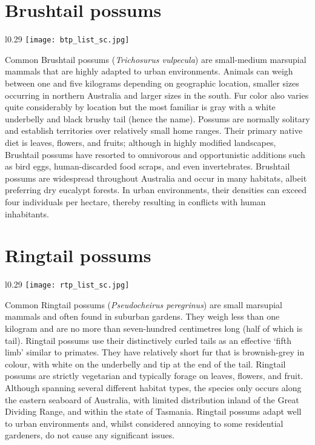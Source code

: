 \section{Brushtail possums}\label{btp}
\vspace{-0.3cm}
\setlength\intextsep{0pt}
\begin{wrapfigure}{l}{0.29\textwidth}
\centering
\texttt{[image: btp\_list\_sc.jpg]}
\end{wrapfigure}
Common Brushtail possums (\textit{Trichosurus vulpecula}) are small-medium marsupial mammals that are highly adapted to urban environments. Animals can weigh between one and five kilograms depending on geographic location, smaller sizes occurring in northern Australia and larger sizes in the south. Fur color also varies quite considerably by location but the most familiar is gray with a white underbelly and black brushy tail (hence the name). Possums are normally solitary and establish territories over relatively small home ranges. Their primary native diet is leaves, flowers, and fruits; although in highly modified landscapes, Brushtail possums have resorted to omnivorous and opportunistic additions such as bird eggs, human-discarded food scraps, and even invertebrates. Brushtail possums are widespread throughout Australia and occur in many habitats, albeit preferring dry eucalypt forests. In urban environments, their densities can exceed four individuals per hectare, thereby resulting in conflicts with human inhabitants.

\section{Ringtail possums}\label{rtp}
\vspace{-0.3cm}
\setlength\intextsep{0pt}
\begin{wrapfigure}{l}{0.29\textwidth}
\centering
\texttt{[image: rtp\_list\_sc.jpg]}
\end{wrapfigure}
Common Ringtail possums (\textit{Pseudocheirus peregrinus}) are small marsupial mammals and often found in suburban gardens. They weigh less than one kilogram and are no more than seven-hundred centimetres long (half of which is tail). Ringtail possums use their distinctively curled tails as an effective `fifth limb' similar to primates. They have relatively short fur that is brownish-grey in colour, with white on the underbelly and tip at the end of the tail. Ringtail possums are strictly vegetarian and typically forage on leaves, flowers, and fruit. Although spanning several different habitat types, the species only occurs along the eastern seaboard of Australia, with limited distribution inland of the Great Dividing Range, and within the state of Tasmania. Ringtail possums adapt well to urban environments and, whilst considered annoying to some residential gardeners, do not cause any significant issues.
